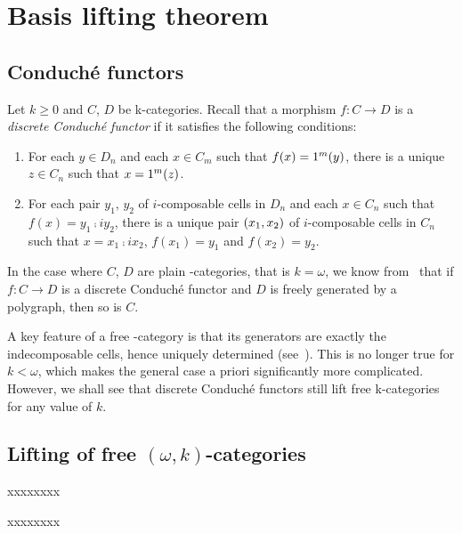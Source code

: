 \section{Basis lifting theorem}\label{sec:basislift}

\subsection{Conduché functors}\label{subsec:conduche}
\begin{paragr}
  Let $k\geq 0$ and $C$, $D$ be \ook k-categories. Recall that a morphism $f:C\to D$ is a {\em discrete Conduché functor} if it satisfies the following conditions:
  \begin{enumerate}  
  \item For each $y\in D_n$ and each $x\in C_m$ such that $f(x)=1^{m}(y)$, there is a unique $z\in C_n$ such that $x=1^{m}(z)$.
    \item For each pair $y_1$, $y_2$ of $i$-composable cells in $D_n$ and each $x\in C_n$ such that $f(x)=y_1\comp i y_2$, there is a unique pair $(x_1,x_2)$ of $i$-composable cells in $C_n$ such that $x=x_1\comp i x_2$, $f(x_1)=y_1$ and $f(x_2)=y_2$.
    \end{enumerate}
    In the case where $C$, $D$ are plain \oo-categories, that is $k=\omega$, we know from~\cite[Theorem 6.11]{guetta:poldcf} that if $f:C\to D$ is a discrete Conduché functor and $D$ is freely generated by a polygraph, then so is $C$.
  \end{paragr}
  \begin{remark}
     A key feature of a free \oo-category is that its generators are
     exactly the indecomposable cells, hence uniquely determined
     (see~\cite[Section 4, Proposition 8.3]{makkai:worcom}). This is
     no longer true for $k<\omega$, which makes the general case a
     priori significantly more complicated. However, we shall see that
     discrete Conduché functors still lift free \ook k-categories for any value of $k$.
  \end{remark}
    




\subsection{Lifting of free $(\omega,k)$-categories}\label{subsec:lifting}
\begin{paragr}
  xxxxxxxx
\end{paragr}
\begin{theorem}
  xxxxxxxx
\end{theorem}
